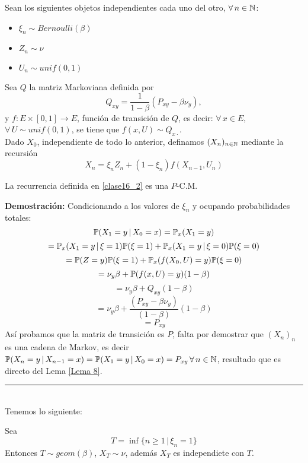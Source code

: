 Sean los siguientes objetos independientes cada uno del otro, $\forall\,n\in\mathbb N$:
\begin{itemize}
    \item $\xi_n \sim Bernoulli(\beta)$
    \item $Z_n \sim \nu$
    \item $U_n \sim unif(0,1)$
\end{itemize}
Sea $Q$ la matriz Markoviana definida por
\[Q_{xy} = \frac{1}{1-\beta}(P_{xy}-\beta \nu_y),\]
y $f:E\times [0,1]\rightarrow E$, función de transición de $Q$, es decir: $\forall\,x\in E$, $\forall\,U\sim unif(0,1)$, se tiene que $f(x,U)\sim Q_{x\cdot}$.\\ \newline
Dado $X_0$, independiente de todo lo anterior, definamos $(X_n)_{n\in \mathbb N}$ mediante la recursión
\begin{equation}
    X_n = \xi_n Z_n + (1-\xi_n)f(X_{n-1},U_n)
    \label{clase16_2}
\end{equation}
\begin{prop}
\label{porp}
La recurrencia definida en \ref{clase16_2} es una $P$-C.M.
\end{prop}

\textbf{Demostración: }Condicionando a los valores de $\xi_n$ y ocupando probabilidades totales:
\[\mathbb{P}(X_1 = y\,|\,X_0=x) = \mathbb{P}_x(X_1=y)\]
\[= \mathbb{P}_x(X_1=y\,|\,\xi = 1)\mathbb{P}(\xi =1) + \mathbb{P}_x(X_1=y\,|\,\xi=0)\mathbb{P}(\xi=0)\]
\[ = \mathbb{P}(Z = y)\mathbb{P}(\xi = 1) + \mathbb{P}_x(f(X_0,U)=y)\mathbb{P}(\xi=0)\]
\[ = \nu_y\beta + \mathbb{P}(f(x,U)=y)(1-\beta)\]
\[ = \nu_y \beta + Q_{xy}(1-\beta)\]
\[=\nu_y\beta + \frac{(P_{xy}-\beta \nu_y)}{(1-\beta)}(1-\beta)\]
\[= P_{xy}\]
Así probamos que la matriz de transición es $P$, falta por demostrar que $(X_n)_n$ es una cadena de Markov, es decir $\mathbb{P}(X_n=y\,|\,X_{n-1}=x)=\mathbb{P}(X_1=y\,|\,X_0=x)=P_{xy}\,\forall\,n\in\mathbb N$, resultado que es directo del Lema \ref{Lema 8}.\\
\rule{0.7em}{0.7em}\\ \newline
Tenemos lo siguiente:
\begin{prop}
Sea
\[T = \inf\{n\geq 1\,|\,\xi_n=1\}\]
Entonces $T\sim geom(\beta)$, $X_T \sim \nu$, además $X_T$ es independiete con $T$.
\end{prop}

